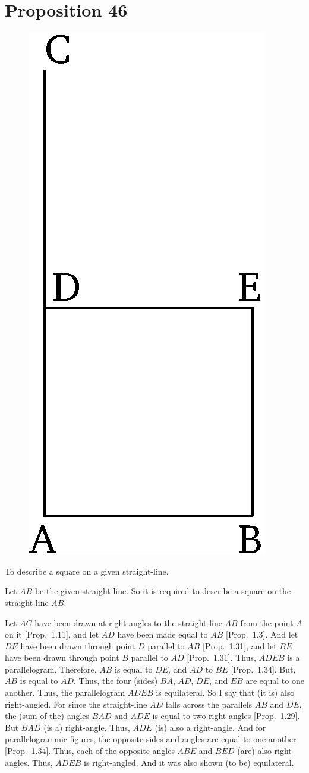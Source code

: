 \chapter*{Proposition 46}



\begin{figure}[ht]
    \begin{center}
    \includegraphics[width=0.5\linewidth]{figures/fig46e.eps}
    \label{fig:prop_46}
    \end{center}
\end{figure}

To describe a square on a given straight-line.

Let $AB$ be the given straight-line. So it is required to describe a
square on the straight-line $AB$.

Let $AC$ have been drawn at right-angles to the straight-line $AB$
from the point $A$ on it [Prop.~1.11], and let $AD$ have been
made equal to $AB$ [Prop.~1.3]. And let $DE$ have been drawn
through point $D$ parallel to $AB$ [Prop.~1.31], and let $BE$ have been
drawn through point $B$ parallel to $AD$ [Prop.~1.31]. Thus,
$ADEB$ is a parallelogram. Therefore, $AB$ is equal to $DE$, and $AD$ to $BE$ [Prop.~1.34]. But, $AB$ is equal to $AD$. Thus, the four (sides) $BA$, $AD$, $DE$, and $EB$ are equal to one another. Thus, the parallelogram $ADEB$ is equilateral.
So I say that (it is) also right-angled. For since the straight-line $AD$ falls
across the parallels $AB$ and $DE$, the (sum of the) angles $BAD$ and $ADE$ is
equal to two right-angles [Prop.~1.29]. But $BAD$ (is a) right-angle. Thus,
$ADE$ (is) also a right-angle. And for parallelogrammic figures, the opposite
sides and angles are equal to one another [Prop.~1.34]. Thus, each of the
opposite angles $ABE$ and $BED$ (are) also right-angles. Thus, $ADEB$ is
right-angled. And it was also shown (to be) equilateral.

